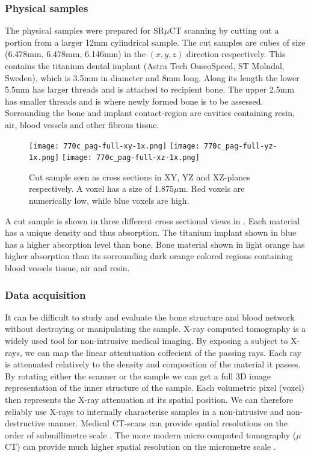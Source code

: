 \subsubsection{Physical samples}

The physical samples were prepared for SR$\mu$CT scanning by cutting out a portion from a larger
12mm cylindrical sample. The cut samples are cubes of size (6.478mm, 6.478mm, 6.146mm) in the
$(x,y,z)$ direction respectively. This contains the titanium dental implant (Astra Tech OsseoSpeed,
ST Molndal, Sweden), which is 3.5mm in diameter and 8mm long. Along its length the lower 5.5mm
has larger threads and is attached to recipient bone. The upper 2.5mm has smaller threads and
is where newly formed bone is to be assessed. Sorrounding the bone and implant contact-region
are cavities containing resin, air, blood vessels and other fibrous tissue.

\begin{figure}
\centering
\texttt{[image: 770c\_pag-full-xy-1x.png]}
\texttt{[image: 770c\_pag-full-yz-1x.png]}
\texttt{[image: 770c\_pag-full-xz-1x.png]}
\caption{Cut sample seen as cross sections in XY, YZ and XZ-planes respectively. A voxel has a size
of 1.875$\mu$m. Red voxels are numerically low, while blue voxels are high.}
\label{fig:3viewsample}
\end{figure}

A cut sample is shown in three different cross sectional views in . Each
material has a unique density and thus absorption. The titanium implant shown in blue has a
higher absorption level than bone. Bone material shown in light orange has higher absorption
than its sorrounding dark orange colored regions containing blood vessels tissue, air and resin.

\subsubsection{Data acquisition}

It can be difficult to study and evaluate the bone structure and blood network without destroying
or manipulating the sample. X-ray computed tomography is a widely used tool for non-intrusive medical
imaging. By exposing a subject to X-rays, we can map the linear attentuation coffecient of the passing
rays. Each ray is attenuated relatively to the density and composition of the material it passes.
By rotating either the scanner or the sample we can get a full 3D image representation of the inner
structure of the sample. Each volumetric pixel (voxel) then represents the X-ray attenuation at its
spatial position. We can therefore reliably use X-rays to internally characterise samples in a
non-intrusive and non-destructive manner. Medical CT-scans can provide spatial resolutions on the
order of submillimetre scale \citep{medicalct}. The more modern micro computed tomography ($\mu$CT)
can provide much higher spatial resolution on the micrometre scale \citep{srexptime}.

